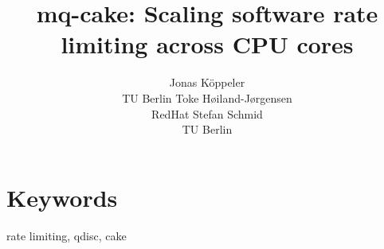 \documentclass[letterpaper]{article}
\title{mq-cake: Scaling software rate limiting across CPU cores}
\author{Jonas Köppeler\\TU Berlin \And Toke H\o{}iland-J\o{}rgensen\\RedHat \And Stefan Schmid \\ TU Berlin
}
\begin{document}
 
\maketitle

\section{Keywords}
rate limiting, qdisc, cake








\end{document}
